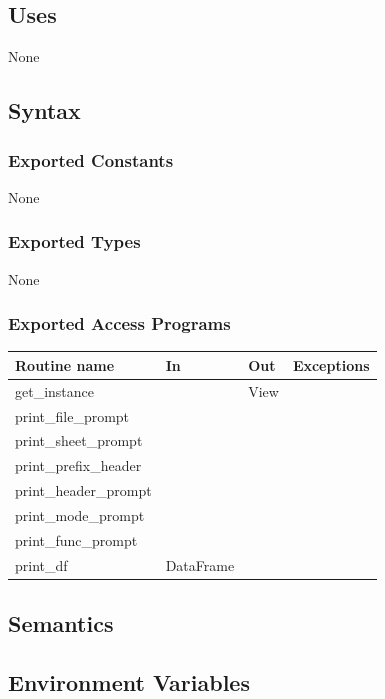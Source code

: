 \documentclass[12pt]{article}
\begin{document}
\subsection* {Uses}

None

\subsection* {Syntax}

\subsubsection* {Exported Constants}

None

\subsubsection* {Exported Types}

None

\subsubsection* {Exported Access Programs}

\begin{tabular}{| l | l | l | p{5cm} |}
  \hline
  \textbf{Routine name} & \textbf{In} & \textbf{Out} & \textbf{Exceptions}\\
  \hline
  get\_instance &  & View & \\
  \hline
  print\_file\_prompt & &  & \\
  \hline
  print\_sheet\_prompt & & & \\
  \hline
  print\_prefix\_header & & & \\
  \hline
  print\_header\_prompt & & & \\
  \hline
  print\_mode\_prompt & & & \\
  \hline
  print\_func\_prompt & & & \\
  \hline
  print\_df & DataFrame & & \\
  \hline

\end{tabular}

\subsection* {Semantics}

\subsection*{Environment Variables}
\end{document}
